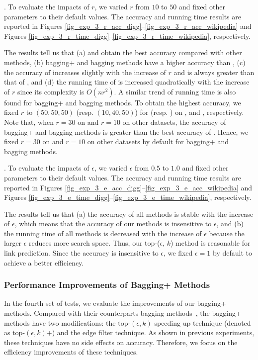 . To evaluate the impacts of $r$, we
varied $r$ from $10$ to $50$ and fixed other parameters to their
default values. The accuracy and running time results are reported in
Figures \ref{fig_exp_3_r_acc_digg}--\ref{fig_exp_3_r_acc_wikipedia} and
Figures \ref{fig_exp_3_r_time_digg}--\ref{fig_exp_3_r_time_wikipedia}, respectively.


The results tell us that (a) \Biasedp and \Biased obtain the best accuracy
compared with other methods, (b) bagging+ and bagging methods have a higher accuracy
than \BIGCLAM, (c) the accuracy of \NMF increases slightly with the increase of $r$ and is always
greater than that of \BIGCLAM, and (d) the running time of \NMF is increased
quadratically with the increase of $r$ since its complexity is $O(nr^2)$.
A similar trend of running time is also found for bagging+ and bagging methods.
To obtain the highest accuracy, we fixed $r$ to $(50, 50, 50)$ (resp. $(10, 40, 50)$)
for \NMF (resp. \BIGCLAM) on \Digg, \YouTube and \Wikipedia, respectively.
Note that, when $r = 30$ on \Digg and $r = 10$ on other datasets, the accuracy
of bagging+ and bagging methods is greater than the best accuracy of \NMF. Hence, we
fixed $r = 30$ on \Digg and $r = 10$ on other datasets by default for bagging+ and bagging methods.






. To evaluate the impacts of $\epsilon$, we
varied $\epsilon$ from $0.5$ to $1.0$ and fixed other parameters to their
default values. The accuracy and running time results are reported in
Figures \ref{fig_exp_3_e_acc_digg}--\ref{fig_exp_3_e_acc_wikipedia} and
Figures \ref{fig_exp_3_e_time_digg}--\ref{fig_exp_3_e_time_wikipedia}, respectively.



The results tell us that (a) the accuracy of all methods is stable with
the increase of $\epsilon$, which means that the accuracy of our methods is insensitive
to $\epsilon$, and (b) the running time of all methods is decreased with the increase of $\epsilon$
because the larger $\epsilon$ reduces more search space. Thus, our top-($\epsilon$, $k$)
method is reasonable for link prediction. Since the accuracy is insensitive to $\epsilon$, we
fixed $\epsilon = 1$ by default to achieve a better efficiency.





\subsubsection{Performance Improvements of Bagging+ Methods}
In the fourth set of tests, we evaluate the improvements of our bagging+ methods.
Compared with their counterparts bagging methods~\cite{liang2016}, the bagging+ methods have two modifications:
the top-$(\epsilon, k)$ speeding up technique (denoted as top-$(\epsilon, k)$+) and the edge filter technique.
As shown in previous experiments, these techniques have no side effects on accuracy.
Therefore, we focus on the efficiency improvements of these techniques.


